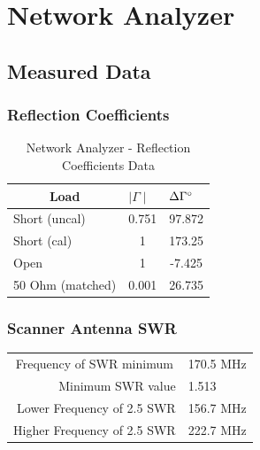 \documentclass{article}
\begin{document}
\section{Network Analyzer}
\subsection{Measured Data}
\subsubsection{Reflection Coefficients}
\begin{table}[H]
\centering
	\begin{tabular}{|l|c|c|}
	\hline
	\multicolumn{1}{|c|}{\textbf{Load}} & \multicolumn{1}{l|}{\textbf{$\mid\Gamma\mid$}} & \multicolumn{1}{l|}{\textbf{$\Delta\Gamma\degree$}} \\ \hline
	Short (uncal)                       & 0.751                               & 97.872                              	\\ \hline
	Short (cal)                         & 1                                   & 173.25                              	\\ \hline
	Open                                & 1                                   & -7.425                              	\\ \hline
	50 Ohm (matched)                    & 0.001                               & 26.735                              	\\ \hline
	\end{tabular}
	\caption{Network Analyzer - Reflection Coefficients Data}
	\label{}
\end{table}

\subsubsection{Scanner Antenna SWR}
\begin{table}[H]
	\begin{tabular}{rl}
	\multicolumn{1}{c}{Frequency of SWR minimum} & 170.5 MHz \\
	Minimum SWR value                            & 1.513     \\
	Lower Frequency of 2.5 SWR                   & 156.7 MHz \\
	Higher Frequency of 2.5 SWR                  & 222.7 MHz            
	\end{tabular}
\end{table}
\end{document}
